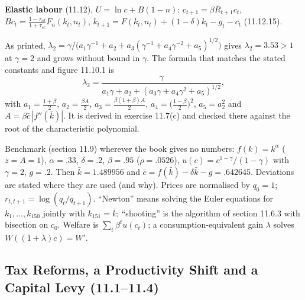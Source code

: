 \documentclass[12pt, letterpaper]{article}
\newcommand{\Rb}{\bar R}
\newcommand{\kb}{\bar k}
\newcommand{\cb}{\bar c}
\begin{document}
\begin{tcolorbox}[theorybox,title={Chapter 11 Overview}]
\textbf{Elastic labour} (11.12), $U=\ln c+B(1-n)$: $c_{t+1}=\beta\Rb_{t+1}c_t$, $Bc_t=\frac{1-\tau_{nt}}{1+\tau_{ct}}F_n(k_t,n_t)$,
$k_{t+1}=F(k_t,n_t)+(1-\delta)k_t-g_t-c_t$ (11.12.15).
\end{tcolorbox}

\begin{tcolorbox}[trapbox,title={Misprint in the chapter: formula (11.10.16)}]
As printed, $\lambda_2=\gamma/\big(a_1\gamma^{-1}+a_2+a_3(\gamma^{-1}+a_4\gamma^{-2}+a_5)^{1/2}\big)$ gives
$\lambda_2=3.53>1$ at $\gamma=2$ and grows without bound in $\gamma$. The formula that matches the stated constants and
figure 11.10.1 is
\[
\lambda_2=\frac{\gamma}{a_1\gamma+a_2+(a_3\gamma+a_4\gamma^2+a_5)^{1/2}},
\]
with $a_1=\tfrac{1+\beta}2$, $a_2=\tfrac{\beta A}2$, $a_3=\tfrac{\beta(1+\beta)A}2$, $a_4=\big(\tfrac{1-\beta}2\big)^2$,
$a_5=a_2^2$ and $A=\beta\cb\,|f''(\kb)|$. It is derived in exercise 11.7(c) and checked there against the root of the
characteristic polynomial.
\end{tcolorbox}

\begin{tcolorbox}[databox,title={Conventions and parameters used throughout}]
Benchmark (section 11.9) wherever the book gives no numbers: $f(k)=k^\alpha$ ($z=A=1$), $\alpha=.33$, $\delta=.2$,
$\beta=.95$ ($\rho=.0526$), $u(c)=c^{1-\gamma}/(1-\gamma)$ with $\gamma=2$, $g=.2$. Then $\kb=1.489956$ and
$\cb=f(\kb)-\delta\kb-g=.642645$. Deviations are stated where they are used (and why). Prices are normalised by $q_0=1$;
$r_{t,t+1}=\log(q_t/q_{t+1})$. ``Newton'' means solving the Euler equations for $k_1,\dots,k_{150}$ jointly with
$k_{151}=\kb$; ``shooting'' is the algorithm of section 11.6.3 with bisection on $c_0$. Welfare is
$\sum_t\beta^tu(c_t)$; a consumption-equivalent gain $\lambda$ solves $W((1+\lambda)c)=W'$.
\end{tcolorbox}

\subsection{Tax Reforms, a Productivity Shift and a Capital Levy (11.1--11.4)}
\end{document}
